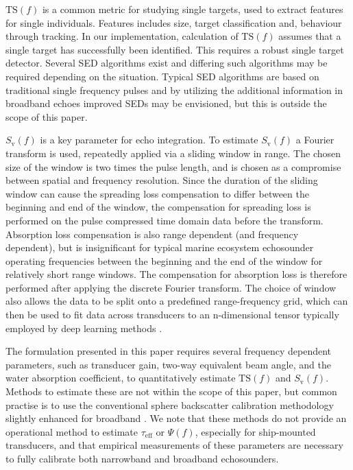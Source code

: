 \documentclass[preprint,12pt,TurnOnLineNumbers]{JASAnew}
\newcommand{\freqsym}{f}
\newcommand{\teff}{\tau_{\textrm{eff}}}
\newcommand{\ts}{\textrm{TS}}
\newcommand{\sv}{S_{\textrm{v}}}
\begin{document}
$\ts(\freqsym)$ is a common metric for studying single targets, used to extract features for single individuals. Features includes size, target classification and, behaviour through tracking. In our implementation, calculation of $\ts(\freqsym)$ assumes that a single target has successfully been identified. This requires a robust single target detector. Several SED algorithms exist and differing such algorithms may be required depending on the situation. Typical SED algorithms are based on traditional single frequency pulses and by utilizing the additional information in broadband echoes improved SEDs may be envisioned, but this is outside the scope of this paper.

$\sv(\freqsym)$ is a key parameter for echo integration. To estimate $\sv(\freqsym)$ a Fourier transform is used, repeatedly applied via a sliding window in range. The chosen size of the window is two times the pulse length, and is chosen as a compromise between spatial and frequency resolution. Since the duration of the sliding window can cause the spreading loss compensation to differ between the beginning and end of the window, the compensation for spreading loss is performed on the pulse compressed time domain data before the transform. Absorption loss compensation is also range dependent (and frequency dependent), but is insignificant for typical marine ecosystem echosounder operating frequencies between the beginning and the end of the window for relatively short range windows. The compensation for absorption loss is therefore performed after applying the discrete Fourier transform. The choice of window also allows the data to be split onto a predefined range-frequency grid, which can then be used to fit data across transducers to an n-dimensional tensor typically employed by deep learning methods \citep[e.g.]{brautaset_acoustic_2020}.

The formulation presented in this paper requires several frequency dependent parameters, such as transducer gain, two-way equivalent beam angle, and the water absorption coefficient, to quantitatively estimate $\ts(\freqsym)$ and $\sv(\freqsym)$. Methods to estimate these are not within the scope of this paper, but common practise is to use the conventional sphere backscatter calibration methodology \citep{demerCalibrationAcousticInstruments2015} slightly enhanced for broadband \citep{hobaekCharacterizationTargetSpheres2013,lavery2017}. We note that these methods do not provide an operational method to estimate $\teff$ or $\Psi(f)$, especially for ship-mounted transducers, and that empirical measurements of these parameters are necessary to fully calibrate both narrowband and broadband echosounders.
\end{document}
